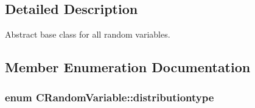 \subsection{Detailed Description}
Abstract base class for all random variables. 

\subsection{Member Enumeration Documentation}
\hypertarget{class_c_random_variable_a80d2a87c43847274138b51f7d713d7f1}{
\subsubsection[{distributiontype}]{\setlength{\rightskip}{0pt plus 5cm}enum {\bf C\-Random\-Variable\-::distributiontype}}}\label{class_c_random_variable_a80d2a87c43847274138b51f7d713d7f1}
